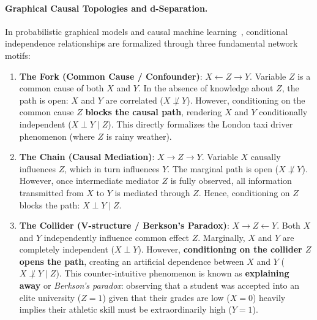 \paragraph{Graphical Causal Topologies and d-Separation.}
In probabilistic graphical models and causal machine learning~\cite{russell2020artificial,bishop2024deep}, conditional independence relationships are formalized through three fundamental network motifs:
\begin{enumerate}
  \item \textbf{The Fork (Common Cause / Confounder)}: $X \leftarrow Z \rightarrow Y$. 
  Variable $Z$ is a common cause of both $X$ and $Y$. In the absence of knowledge about $Z$, the path is open: $X$ and $Y$ are correlated ($X \not\perp Y$). However, conditioning on the common cause $Z$ \textbf{blocks the causal path}, rendering $X$ and $Y$ conditionally independent ($X \perp Y \mid Z$). This directly formalizes the London taxi driver phenomenon (where $Z$ is rainy weather).
  \item \textbf{The Chain (Causal Mediation)}: $X \rightarrow Z \rightarrow Y$.
  Variable $X$ causally influences $Z$, which in turn influences $Y$. The marginal path is open ($X \not\perp Y$). However, once intermediate mediator $Z$ is fully observed, all information transmitted from $X$ to $Y$ is mediated through $Z$. Hence, conditioning on $Z$ blocks the path: $X \perp Y \mid Z$.
  \item \textbf{The Collider (V-structure / Berkson's Paradox)}: $X \rightarrow Z \leftarrow Y$.
  Both $X$ and $Y$ independently influence common effect $Z$. Marginally, $X$ and $Y$ are completely independent ($X \perp Y$). However, \textbf{conditioning on the collider $Z$ opens the path}, creating an artificial dependence between $X$ and $Y$ ($X \not\perp Y \mid Z$). This counter-intuitive phenomenon is known as \textbf{explaining away} or \emph{Berkson's paradox}: observing that a student was accepted into an elite university ($Z=1$) given that their grades are low ($X=0$) heavily implies their athletic skill must be extraordinarily high ($Y=1$).
\end{enumerate}

